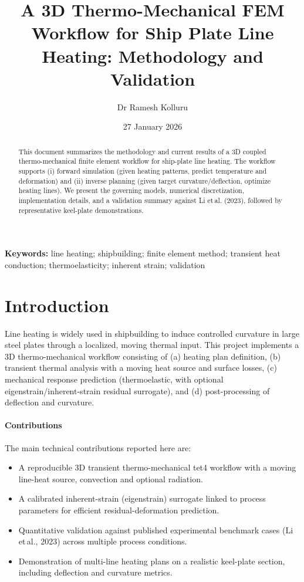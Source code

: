 \documentclass[11pt,a4paper]{article}
\title{A 3D Thermo-Mechanical FEM Workflow for Ship Plate Line Heating: Methodology and Validation}
\author{Dr Ramesh Kolluru}
\date{27 January 2026}
\begin{document}
\maketitle

\begin{abstract}
This document summarizes the methodology and current results of a 3D coupled thermo-mechanical finite element workflow for ship-plate line heating. The workflow supports (i) forward simulation (given heating patterns, predict temperature and deformation) and (ii) inverse planning (given target curvature/deflection, optimize heating lines). We present the governing models, numerical discretization, implementation details, and a validation summary against Li et\,al. (2023), followed by representative keel-plate demonstrations.
\end{abstract}

\noindent\textbf{Keywords:} line heating; shipbuilding; finite element method; transient heat conduction; thermoelasticity; inherent strain; validation

\tableofcontents
\newpage

\section{Introduction}
Line heating is widely used in shipbuilding to induce controlled curvature in large steel plates through a localized, moving thermal input. This project implements a 3D thermo-mechanical workflow consisting of (a) heating plan definition, (b) transient thermal analysis with a moving heat source and surface losses, (c) mechanical response prediction (thermoelastic, with optional eigenstrain/inherent-strain residual surrogate), and (d) post-processing of deflection and curvature.

\paragraph{Contributions} The main technical contributions reported here are:
\begin{itemize}
  \item A reproducible 3D transient thermo-mechanical tet4 workflow with a moving line-heat source, convection and optional radiation.
  \item A calibrated inherent-strain (eigenstrain) surrogate linked to process parameters for efficient residual-deformation prediction.
  \item Quantitative validation against published experimental benchmark cases (Li et\,al., 2023) across multiple process conditions.
  \item Demonstration of multi-line heating plans on a realistic keel-plate section, including deflection and curvature metrics.
\end{itemize}
\end{document}
